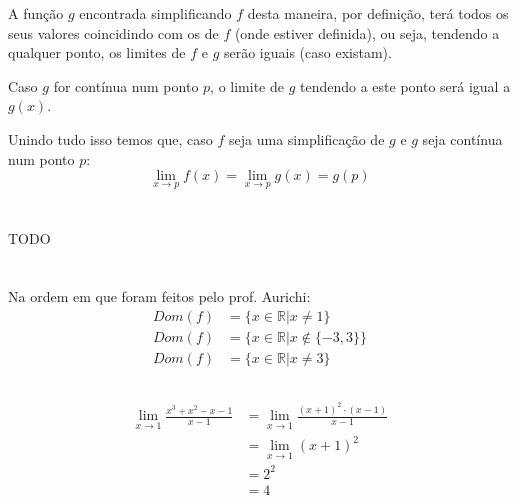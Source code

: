 \documentclass[12pt]{article}
\begin{document}
A função \(g\) encontrada simplificando \(f\) desta maneira, por definição, terá todos os seus valores coincidindo com os de \(f\) (onde estiver definida), ou seja, tendendo a qualquer ponto, os limites de \(f\) e \(g\) serão iguais (caso existam).

Caso \(g\) for contínua num ponto \(p\), o limite de \(g\) tendendo a este ponto será igual a \(g(x)\).

Unindo tudo isso temos que, caso \(f\) seja uma simplificação de \(g\) e \(g\) seja contínua num ponto \(p\):
\[
	\lim_{x \rightarrow p} f(x) = \lim_{x \rightarrow p} g(x) = g(p)
\]

\section{}
\subsection{}
TODO

\section{}

\section{}
\subsection{}
Na ordem em que foram feitos pelo prof. Aurichi:
\begin{align*}
	Dom(f) &= \{x \in \mathbb{R} | x \ne 1\} \\
	Dom(f) &= \{x \in \mathbb{R} | x \notin\{-3, 3\}\} \\
	Dom(f) &= \{x \in \mathbb{R} | x \ne 3\} 
\end{align*}
\subsection{}
\subsubsection{}
\begin{align*}
	\lim_{x\rightarrow 1} \frac{x^3 + x^2 - x - 1}{x-1} &= \lim_{x\rightarrow 1} \frac{{(x+1)}^2 \cdot (x-1)}{x-1} \\
	&= \lim_{x\rightarrow 1} {(x+1)}^2 \\
	&= 2^2 \\
	&= 4
\end{align*}
\end{document}
